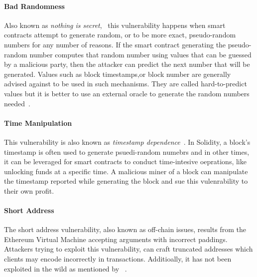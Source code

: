             \paragraph{Bad Randomness}
            Also known as \textit{nothing is secret},~\cite{dasp} this vulnerability happens when smart contracts attempt to generate random, or to be more exact, pseudo-random numbers for any number of reasons.
            If the smart contract generating the pseudo-random number computes that random number using values that can be guessed by a malicious party, then the attacker can predict the next number that will be generated.
            Values such as block timestamps,or block number are generally advised against to be used in such mechanisms. They are called hard-to-predict values but it is better to use an external oracle to generate the random numbers needed~\cite{swcregistry}.
        
            \paragraph{Time Manipulation}
            This vulnerability is also known as \textit{timestamp dependence}~\cite{dasp}.
            In Solidity, a block's timestamp is often used to generate psuedi-random numebrs and in other times, it can be leveraged for smart contracts to conduct time-intesive oeprations, like unlocking funds at a specific time.
            A malicious miner of a block can manipulate the timestamp reported while generating the block and sue this vulenrability to their own profit. 
        
            \paragraph{Short Address}
            The short address vulnerability, also known as off-chain issues, results from the Ethereum Virtual Machine accepting arguments with incorrect paddings.
            Attackers trying to exploit this vulnerability, can craft truncated addresses which clients may encode incorrectly in transactions.
            Additioally, it has not been exploited in the wild as mentioned by ~\cite{ferreira2020smartbugs}.